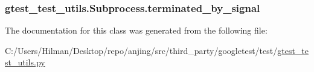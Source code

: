 \subsubsection[{terminated\+\_\+by\+\_\+signal}]{\setlength{\rightskip}{0pt plus 5cm}gtest\+\_\+test\+\_\+utils.\+Subprocess.\+terminated\+\_\+by\+\_\+signal}\label{classgtest__test__utils_1_1_subprocess_a9654b9eddd43c93acf66d5c7b0026fca}


The documentation for this class was generated from the following file\+:\begin{DoxyCompactItemize}
\item 
C\+:/\+Users/\+Hilman/\+Desktop/repo/anjing/src/third\+\_\+party/googletest/test/\hyperlink{gtest__test__utils_8py}{gtest\+\_\+test\+\_\+utils.\+py}\end{DoxyCompactItemize}
